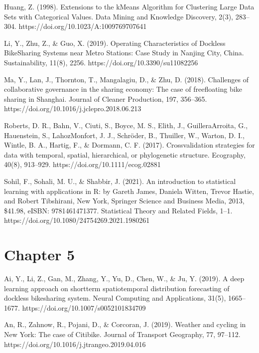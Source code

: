 \documentclass[letterpaper,10pt,english]{jupyterBook}
\begin{document}
\sphinxAtStartPar
Huang, Z. (1998). Extensions to the k\sphinxhyphen{}Means Algorithm for Clustering Large Data Sets with Categorical Values. Data Mining and Knowledge Discovery, 2(3), 283–304. https://doi.org/10.1023/A:1009769707641

\sphinxAtStartPar
Li, Y., Zhu, Z., \& Guo, X. (2019). Operating Characteristics of Dockless Bike\sphinxhyphen{}Sharing Systems near Metro Stations: Case Study in Nanjing City, China. Sustainability, 11(8), 2256. https://doi.org/10.3390/su11082256

\sphinxAtStartPar
Ma, Y., Lan, J., Thornton, T., Mangalagiu, D., \& Zhu, D. (2018). Challenges of collaborative governance in the sharing economy: The case of free\sphinxhyphen{}floating bike sharing in Shanghai. Journal of Cleaner Production, 197, 356–365. https://doi.org/10.1016/j.jclepro.2018.06.213

\sphinxAtStartPar
Roberts, D. R., Bahn, V., Ciuti, S., Boyce, M. S., Elith, J., Guillera\sphinxhyphen{}Arroita, G., Hauenstein, S., Lahoz\sphinxhyphen{}Monfort, J. J., Schröder, B., Thuiller, W., Warton, D. I., Wintle, B. A., Hartig, F., \& Dormann, C. F. (2017). Cross\sphinxhyphen{}validation strategies for data with temporal, spatial, hierarchical, or phylogenetic structure. Ecography, 40(8), 913–929. https://doi.org/10.1111/ecog.02881

\sphinxAtStartPar
Sohil, F., Sohali, M. U., \& Shabbir, J. (2021). An introduction to statistical learning with applications in R: by Gareth James, Daniela Witten, Trevor Hastie, and Robert Tibshirani, New York, Springer Science and Business Media, 2013, \$41.98, eISBN: 978\sphinxhyphen{}1\sphinxhyphen{}4614\sphinxhyphen{}7137\sphinxhyphen{}7. Statistical Theory and Related Fields, 1–1. https://doi.org/10.1080/24754269.2021.1980261


\section{Chapter 5}
\label{\detokenize{references:chapter-5}}
\sphinxAtStartPar
Ai, Y., Li, Z., Gan, M., Zhang, Y., Yu, D., Chen, W., \& Ju, Y. (2019). A deep learning approach on short\sphinxhyphen{}term spatiotemporal distribution forecasting of dockless bike\sphinxhyphen{}sharing system. Neural Computing and Applications, 31(5), 1665–1677. https://doi.org/10.1007/s00521\sphinxhyphen{}018\sphinxhyphen{}3470\sphinxhyphen{}9

\sphinxAtStartPar
An, R., Zahnow, R., Pojani, D., \& Corcoran, J. (2019). Weather and cycling in New York: The case of Citibike. Journal of Transport Geography, 77, 97–112. https://doi.org/10.1016/j.jtrangeo.2019.04.016
\end{document}
